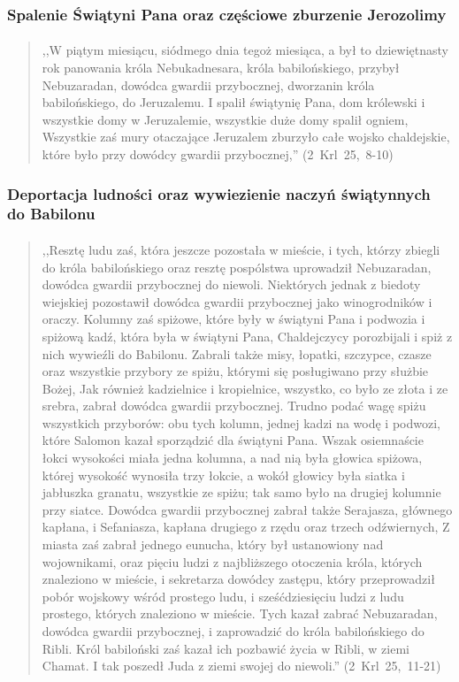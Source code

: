 \documentclass[10pt,a4paper,oneside]{article}
\begin{document}
\subsubsection{Spalenie Świątyni Pana oraz częściowe zburzenie Jerozolimy}
\paragraph{}
\begin{quote}
,,W piątym miesiącu, siódmego dnia tegoż miesiąca, a był to dziewiętnasty rok panowania króla Nebukadnesara, króla babilońskiego, przybył Nebuzaradan, dowódca gwardii przybocznej, dworzanin króla babilońskiego, do Jeruzalemu. I spalił świątynię Pana, dom królewski i wszystkie domy w Jeruzalemie, wszystkie duże domy spalił ogniem, Wszystkie zaś mury otaczające Jeruzalem zburzyło całe wojsko chaldejskie, które było przy dowódcy gwardii przybocznej,'' \mbox{(2 Krl 25, 8-10)}
\end{quote}
\subsubsection{Deportacja ludności oraz wywiezienie naczyń świątynnych do Babilonu}
\paragraph{}
\begin{quote}
,,Resztę ludu zaś, która jeszcze pozostała w mieście, i tych, którzy zbiegli do króla babilońskiego oraz resztę pospólstwa uprowadził Nebuzaradan, dowódca gwardii przybocznej do niewoli. Niektórych jednak z biedoty wiejskiej pozostawił dowódca gwardii przybocznej jako winogrodników i oraczy. Kolumny zaś spiżowe, które były w świątyni Pana i podwozia i spiżową kadź, która była w świątyni Pana, Chaldejczycy porozbijali i spiż z nich wywieźli do Babilonu. Zabrali także misy, łopatki, szczypce, czasze oraz wszystkie przybory ze spiżu, którymi się posługiwano przy służbie Bożej, Jak również kadzielnice i kropielnice, wszystko, co było ze złota i ze srebra, zabrał dowódca gwardii przybocznej. Trudno podać wagę spiżu wszystkich przyborów: obu tych kolumn, jednej kadzi na wodę i podwozi, które Salomon kazał sporządzić dla świątyni Pana. Wszak osiemnaście łokci wysokości miała jedna kolumna, a nad nią była głowica spiżowa, której wysokość wynosiła trzy łokcie, a wokół głowicy była siatka i jabłuszka granatu, wszystkie ze spiżu; tak samo było na drugiej kolumnie przy siatce. Dowódca gwardii przybocznej zabrał także Serajasza, głównego kapłana, i Sefaniasza, kapłana drugiego z rzędu oraz trzech odźwiernych, Z miasta zaś zabrał jednego eunucha, który był ustanowiony nad wojownikami, oraz pięciu ludzi z najbliższego otoczenia króla, których znaleziono w mieście, i sekretarza dowódcy zastępu, który przeprowadził pobór wojskowy wśród prostego ludu, i sześćdziesięciu ludzi z ludu prostego, których znaleziono w mieście. Tych kazał zabrać Nebuzaradan, dowódca gwardii przybocznej, i zaprowadzić do króla babilońskiego do Ribli. Król babiloński zaś kazał ich pozbawić życia w Ribli, w ziemi Chamat. I tak poszedł Juda z ziemi swojej do niewoli.'' \mbox{(2 Krl 25, 11-21)}
\end{quote}
\end{document}
